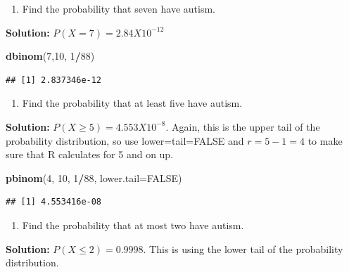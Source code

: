 \documentclass[]{book}
\newenvironment{Shaded}{\begin{snugshade}}{\end{snugshade}}
\newcommand{\DataTypeTok}[1]{\textcolor[rgb]{0.13,0.29,0.53}{#1}}
\newcommand{\DecValTok}[1]{\textcolor[rgb]{0.00,0.00,0.81}{#1}}
\newcommand{\KeywordTok}[1]{\textcolor[rgb]{0.13,0.29,0.53}{\textbf{#1}}}
\newcommand{\NormalTok}[1]{#1}
\newcommand{\OperatorTok}[1]{\textcolor[rgb]{0.81,0.36,0.00}{\textbf{#1}}}
\newcommand{\OtherTok}[1]{\textcolor[rgb]{0.56,0.35,0.01}{#1}}
\providecommand{\tightlist}{%
  \setlength{\itemsep}{0pt}\setlength{\parskip}{0pt}}
\begin{document}
\begin{enumerate}
\def\labelenumi{\alph{enumi}.}
\setcounter{enumi}{3}
\tightlist
\item
  Find the probability that seven have autism.
\end{enumerate}

\textbf{Solution:}
\(P(X=7)=2.84X10^{-12}\)

\begin{Shaded}
\begin{Highlighting}[]
\KeywordTok{dbinom}\NormalTok{(}\DecValTok{7}\NormalTok{,}\DecValTok{10}\NormalTok{, }\DecValTok{1}\OperatorTok{/}\DecValTok{88}\NormalTok{)}
\end{Highlighting}
\end{Shaded}

\begin{verbatim}
## [1] 2.837346e-12
\end{verbatim}

\begin{enumerate}
\def\labelenumi{\alph{enumi}.}
\setcounter{enumi}{4}
\tightlist
\item
  Find the probability that at least five have autism.
\end{enumerate}

\textbf{Solution:}
\(P(X \ge 5)=4.553X10^{-8}\). Again, this is the upper tail of the probability distribution, so use lower=tail=FALSE and \(r=5-1=4\) to make sure that R calculates for 5 and on up.

\begin{Shaded}
\begin{Highlighting}[]
\KeywordTok{pbinom}\NormalTok{(}\DecValTok{4}\NormalTok{, }\DecValTok{10}\NormalTok{, }\DecValTok{1}\OperatorTok{/}\DecValTok{88}\NormalTok{, }\DataTypeTok{lower.tail=}\OtherTok{FALSE}\NormalTok{)}
\end{Highlighting}
\end{Shaded}

\begin{verbatim}
## [1] 4.553416e-08
\end{verbatim}

\begin{enumerate}
\def\labelenumi{\alph{enumi}.}
\setcounter{enumi}{5}
\tightlist
\item
  Find the probability that at most two have autism.
\end{enumerate}

\textbf{Solution:}
\(P(X \le 2)=0.9998\). This is using the lower tail of the probability distribution.
\end{document}

